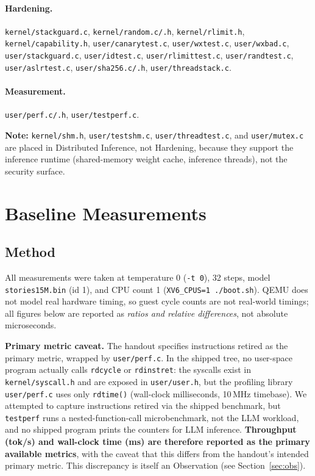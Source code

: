 \documentclass[11pt,a4paper]{article}
\begin{document}
\paragraph{Hardening.}
\texttt{kernel/stackguard.c}, \texttt{kernel/random.c/.h}, \texttt{kernel/rlimit.h}, \texttt{kernel/capability.h}, \texttt{user/canarytest.c}, \texttt{user/wxtest.c}, \texttt{user/wxbad.c}, \texttt{user/stackguard.c}, \texttt{user/idtest.c}, \texttt{user/rlimittest.c}, \texttt{user/randtest.c}, \texttt{user/aslrtest.c}, \texttt{user/sha256.c/.h}, \texttt{user/threadstack.c}.

\paragraph{Measurement.}
\texttt{user/perf.c/.h}, \texttt{user/testperf.c}.

\noindent\textbf{Note:} \texttt{kernel/shm.h}, \texttt{user/testshm.c}, \texttt{user/threadtest.c}, and \texttt{user/mutex.c} are placed in Distributed Inference, not Hardening, because they support the inference runtime (shared-memory weight cache, inference threads), not the security surface.

\section{Baseline Measurements}
\label{sec:baseline}

\subsection{Method}

All measurements were taken at temperature $0$ (\texttt{-t 0}), 32 steps, model \texttt{stories15M.bin} (id 1), and CPU count 1 (\texttt{XV6\_CPUS=1 ./boot.sh}). QEMU does not model real hardware timing, so guest cycle counts are not real-world timings; all figures below are reported as \emph{ratios and relative differences}, not absolute microseconds.

\textbf{Primary metric caveat.} The handout specifies instructions retired as the primary metric, wrapped by \texttt{user/perf.c}. In the shipped tree, no user-space program actually calls \texttt{rdcycle} or \texttt{rdinstret}: the syscalls exist in \texttt{kernel/syscall.h} and are exposed in \texttt{user/user.h}, but the profiling library \texttt{user/perf.c} uses only \texttt{rdtime()} (wall-clock milliseconds, 10\,MHz timebase). We attempted to capture instructions retired via the shipped benchmark, but \texttt{testperf} runs a nested-function-call microbenchmark, not the LLM workload, and no shipped program prints the counters for LLM inference. \textbf{Throughput (tok/s) and wall-clock time (ms) are therefore reported as the primary available metrics}, with the caveat that this differs from the handout's intended primary metric. This discrepancy is itself an Observation (see Section~\ref{sec:obs}).
\end{document}

